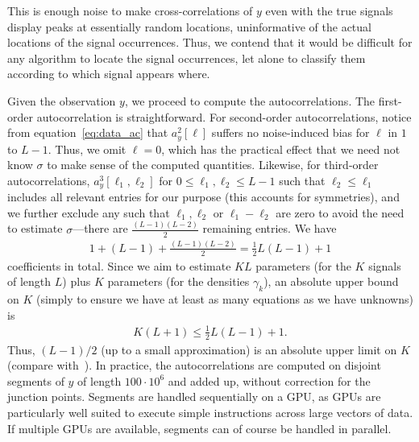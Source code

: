 \documentclass[12pt]{article}
\newcommand{\1}{\mathbf{1}}
\newcommand{\TODO}[1]{{\color{red}{[#1]}}}
\theoremstyle{plain}
\theoremstyle{definition}
\theoremstyle{remark}
\theoremstyle{plain}
\theoremstyle{remark}
\theoremstyle{plain}
\theoremstyle{plain}
\theoremstyle{plain}
\numberwithin{equation}{section}
\begin{document}
This is enough noise to make cross-correlations of $y$ even with the true signals display peaks at essentially random locations, uninformative of the actual locations of the signal occurrences. Thus, we contend that it would be difficult for any algorithm to locate the signal occurrences, let alone to classify them according to which signal appears where.

Given the observation $y$, we proceed to compute the autocorrelations. The first-order autocorrelation is straightforward. For second-order autocorrelations, notice from equation~\eqref{eq:data_ac} that $a_y^2[\ell]$ suffers no noise-induced bias for $\ell$ in $1$ to $L-1$. Thus, we omit $\ell = 0$, which has the practical effect that we need not know $\sigma$ to make sense of the computed quantities. Likewise, for third-order autocorrelations, $a_y^3[\ell_1, \ell_2]$ for $0 \leq \ell_1, \ell_2 \leq L-1$ such that $\ell_2 \leq \ell_1$ includes all relevant entries for our purpose (this accounts for symmetries), and we further exclude any such that $\ell_1, \ell_2$ or $\ell_1 - \ell_2$ are zero to avoid the need to estimate $\sigma$---there are $\frac{(L-1)(L-2)}{2}$ remaining entries. We have
\begin{align*}
1 + (L-1) + \frac{(L-1)(L-2)}{2} = \frac{1}{2} L (L-1) + 1
\end{align*}
coefficients in total. Since we aim to estimate $KL$ parameters (for the $K$ signals of length $L$) plus $K$ parameters (for the densities $\gamma_k$), an absolute upper bound on $K$ (simply to ensure we have at least as many equations as we have unknowns) is
\begin{align*}
K(L+1) \leq \frac{1}{2} L (L-1) + 1.
\end{align*}
Thus, $(L-1)/2$ (up to a small approximation) is an absolute upper limit on $K$ (compare with~\cite{boumal2017heterogeneous,bandeira2017estimation}). \TODO{The last paragraph can be removed}
In practice, the autocorrelations are computed on disjoint segments of $y$ of length $100\cdot10^6$ and added up, without correction for the junction points. Segments are handled sequentially on a GPU, as GPUs are particularly well suited to execute simple instructions across large vectors of data. If multiple GPUs are available, segments can of course be handled in parallel.
\end{document}

